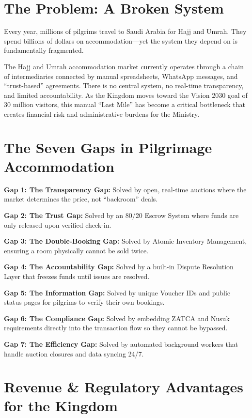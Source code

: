 \documentclass[11pt,a4paper]{article}
\begin{document}
\section{The Problem: A Broken System}

Every year, millions of pilgrims travel to Saudi Arabia for Hajj and Umrah. They spend billions of dollars on accommodation---yet the system they depend on is fundamentally fragmented.

The Hajj and Umrah accommodation market currently operates through a chain of intermediaries connected by manual spreadsheets, WhatsApp messages, and ``trust-based'' agreements. There is no central system, no real-time transparency, and limited accountability. As the Kingdom moves toward the Vision 2030 goal of 30 million visitors, this manual ``Last Mile'' has become a critical bottleneck that creates financial risk and administrative burdens for the Ministry.

\section{The Seven Gaps in Pilgrimage Accommodation}

\textbf{Gap 1: The Transparency Gap:} Solved by open, real-time auctions where the market determines the price, not ``backroom'' deals.

\textbf{Gap 2: The Trust Gap:} Solved by an 80/20 Escrow System where funds are only released upon verified check-in.

\textbf{Gap 3: The Double-Booking Gap:} Solved by Atomic Inventory Management, ensuring a room physically cannot be sold twice.

\textbf{Gap 4: The Accountability Gap:} Solved by a built-in Dispute Resolution Layer that freezes funds until issues are resolved.

\textbf{Gap 5: The Information Gap:} Solved by unique Voucher IDs and public status pages for pilgrims to verify their own bookings.

\textbf{Gap 6: The Compliance Gap:} Solved by embedding ZATCA and Nusuk requirements directly into the transaction flow so they cannot be bypassed.

\textbf{Gap 7: The Efficiency Gap:} Solved by automated background workers that handle auction closures and data syncing 24/7.

\section{Revenue \& Regulatory Advantages for the Kingdom}
\end{document}
